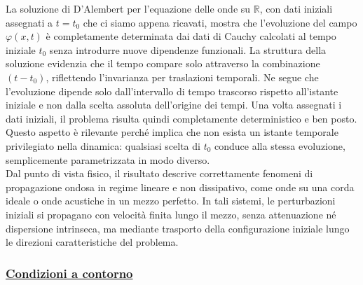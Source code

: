 \documentclass[a4paper,12pt]{report}
\begin{document}
La soluzione di D’Alembert per l’equazione delle onde su $\mathbb{R}$, con dati iniziali assegnati a $t=t_0$ che ci siamo appena ricavati, mostra che l’evoluzione del campo $\varphi(x,t)$ è completamente determinata dai dati di Cauchy calcolati al tempo iniziale $t_0$ senza introdurre nuove dipendenze funzionali. La struttura della soluzione evidenzia che il tempo compare solo attraverso la combinazione $(t-t_0)$, riflettendo l’invarianza per traslazioni temporali. Ne segue che l’evoluzione dipende solo dall’intervallo di tempo trascorso rispetto all’istante iniziale e non dalla scelta assoluta dell’origine dei tempi. Una volta assegnati i dati iniziali, il problema risulta quindi completamente deterministico e ben posto. Questo aspetto è rilevante perché implica che non esista un istante temporale privilegiato nella dinamica: qualsiasi scelta di $t_0$ conduce alla stessa evoluzione, semplicemente parametrizzata in modo diverso.
\\Dal punto di vista fisico, il risultato descrive correttamente fenomeni di propagazione ondosa in regime lineare e non dissipativo, come onde su una corda ideale o onde acustiche in un mezzo perfetto. In tali sistemi, le perturbazioni iniziali si propagano con velocità finita lungo il mezzo, senza attenuazione né dispersione intrinseca, ma mediante trasporto della configurazione iniziale lungo le direzioni caratteristiche del problema.

\newpage

\subsubsection{\underline{Condizioni a contorno}}
\end{document}
